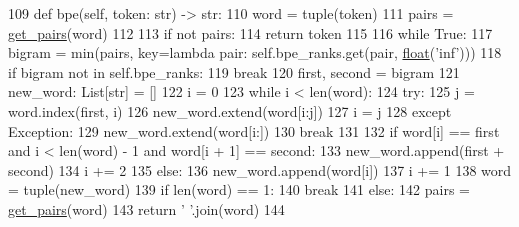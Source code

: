 \begin{DoxyCode}
109     \textcolor{keyword}{def }bpe(self, token: str) -> str:
110         word = tuple(token)
111         pairs = \hyperlink{namespaceparlai_1_1core_1_1gpt2__helper_ac5bffa2aece99e43444185ba85dff425}{get\_pairs}(word)
112 
113         \textcolor{keywordflow}{if} \textcolor{keywordflow}{not} pairs:
114             \textcolor{keywordflow}{return} token
115 
116         \textcolor{keywordflow}{while} \textcolor{keyword}{True}:
117             bigram = min(pairs, key=\textcolor{keyword}{lambda} pair: self.bpe\_ranks.get(pair, \hyperlink{namespaceprojects_1_1controllable__dialogue_1_1make__control__dataset_aa2b7207688c641dbc094ab44eca27113}{float}(\textcolor{stringliteral}{'inf'})))
118             \textcolor{keywordflow}{if} bigram \textcolor{keywordflow}{not} \textcolor{keywordflow}{in} self.bpe\_ranks:
119                 \textcolor{keywordflow}{break}
120             first, second = bigram
121             new\_word: List[str] = []
122             i = 0
123             \textcolor{keywordflow}{while} i < len(word):
124                 \textcolor{keywordflow}{try}:
125                     j = word.index(first, i)
126                     new\_word.extend(word[i:j])
127                     i = j
128                 \textcolor{keywordflow}{except} Exception:
129                     new\_word.extend(word[i:])
130                     \textcolor{keywordflow}{break}
131 
132                 \textcolor{keywordflow}{if} word[i] == first \textcolor{keywordflow}{and} i < len(word) - 1 \textcolor{keywordflow}{and} word[i + 1] == second:
133                     new\_word.append(first + second)
134                     i += 2
135                 \textcolor{keywordflow}{else}:
136                     new\_word.append(word[i])
137                     i += 1
138             word = tuple(new\_word)
139             \textcolor{keywordflow}{if} len(word) == 1:
140                 \textcolor{keywordflow}{break}
141             \textcolor{keywordflow}{else}:
142                 pairs = \hyperlink{namespaceparlai_1_1core_1_1gpt2__helper_ac5bffa2aece99e43444185ba85dff425}{get\_pairs}(word)
143         \textcolor{keywordflow}{return} \textcolor{stringliteral}{' '}.join(word)
144 
\end{DoxyCode}
\mbox{\label{classparlai_1_1core_1_1gpt2__helper_1_1Gpt2BpeHelper_aa14f66814fe7f0030582684666a74b0d}} 
